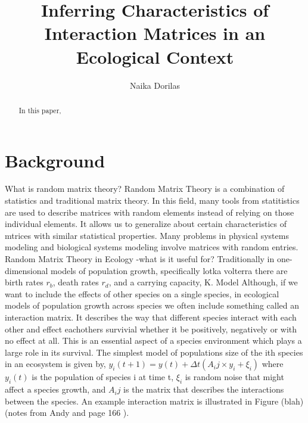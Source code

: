\documentclass{article}
\begin{document}
\title{Inferring Characteristics of Interaction Matrices in an Ecological Context{}}
\author{Naika Dorilas}

\maketitle

\begin{abstract}
In this paper, 
\end{abstract}

\section{Background}
What is random matrix theory?\hfill\break
Random Matrix Theory is a combination of statistics and traditional matrix theory. In this field, many tools from statitistics are used to describe matrices with random elements instead of relying on those individual elements. It allows us to generalize about certain characteristics of mtrices with similar statistical properties. Many problems in physical systems modeling and biological systems modeling involve matrices with random entries. \hfill\break
Random Matrix Theory in Ecology\hfill\break
-what is it useful for?\hfill\break
Traditionally in one-dimensional models of population growth, specifically lotka volterra there are birth rates $r_b$, death rates $r_d$, and a carrying capacity, K.  \hfill\break
\hfill\break Model \hfill\break \hfill\break
Although, if we want to include the effects of other species on a single species, in ecological models of population growth across species we often include something called an interaction matrix. It describes the way that different species interact with each other and effect eachothers survivial whether it be positively, negatively or with no effect at all. This is an essential aspect of a species environment which plays a large role in its survival. The simplest model of populations size of the ith species in an ecosystem is given by,\hfill\break
\hfill\break 
$y_i(t+1)=y(t) + \Delta t(A_ij\times y_i +\xi_i)$
\hfill\break
where $y_i(t)$ is the population of species i at time t, $\xi_i$ is random noise that might affect a species growth, and $A_ij$ is the matrix that describes the interactions between the species.
\hfill\break 
An example interaction matrix is illustrated in Figure (blah)(notes from Andy and page 166 ). 
\end{document}
